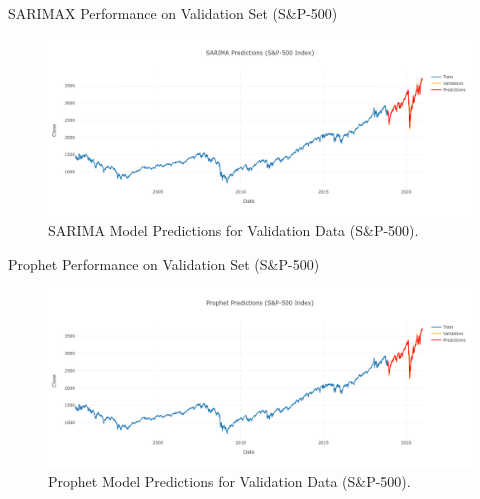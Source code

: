 \documentclass{beamer}
\begin{document}
\begin{frame}{SARIMAX Performance on Validation Set (S\&P-500)}
	\begin{figure}
		\centering
		\includegraphics[width = \textwidth]{images/SARIMA S&P-500 Index Predictions.png}
		\caption{SARIMA Model Predictions for Validation Data (S\&P-500).}
		\label{fig:my_label}
	\end{figure}
\end{frame}

\begin{frame}{Prophet Performance on Validation Set (S\&P-500)}
	\begin{figure}
		\centering
		\includegraphics[width = \textwidth]{images/Prophet S&P-500 Predictions.png}
		\caption{Prophet Model Predictions for Validation Data (S\&P-500).}
		\label{fig:my_label}
	\end{figure}
\end{frame}
\end{document}
